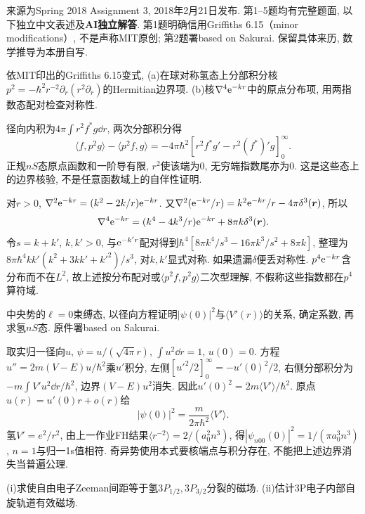 来源为Spring 2018 Assignment 3, 2018年2月21日发布. 第1--5题均有完整题面, 以下独立中文表述及\textbf{AI独立解答}. 第1题明确信用Griffiths 6.15（minor modifications）, 不是声称MIT原创; 第2题署based on Sakurai. 保留具体来历, 数学推导为本册自写.
\begin{exercise}
依MIT印出的Griffiths 6.15变式, (a)在球对称氢态上分部积分核$p^2=-\hbar^2r^{-2}\partial_r(r^2\partial_r)$的Hermitian边界项. (b)核$\nabla^4\mathrm e^{-kr}$中的原点分布项, 用两指数态配对检查对称性.
\end{exercise}
\begin{solution}
径向内积为$4\pi\int r^2f^*g\dd r$, 两次分部积分得
\[
\langle f,p^2g\rangle-\langle p^2f,g\rangle
=-4\pi\hbar^2[r^2f^*g'-r^2(f^*)'g]_0^\infty.
\]
正规$nS$态原点函数和一阶导有限, $r^2$使该端为0, 无穷端指数尾亦为0. 这是这些态上的边界核验, 不是任意函数域上的自伴性证明.

对$r>0$, $\nabla^2\mathrm e^{-kr}=(k^2-2k/r)\mathrm e^{-kr}$. 又$\nabla^2(\mathrm e^{-kr}/r)=k^2\mathrm e^{-kr}/r-4\pi\delta^3(\boldsymbol r)$, 所以
\[
\nabla^4\mathrm e^{-kr}=(k^4-4k^3/r)\mathrm e^{-kr}+8\pi k\delta^3(\boldsymbol r).
\]
令$s=k+k'$, $k,k'>0$, 与$\mathrm e^{-k'r}$配对得到$\hbar^4[8\pi k^4/s^3-16\pi k^3/s^2+8\pi k]$, 整理为
$8\pi\hbar^4kk'(k^2+3kk'+k'^2)/s^3$, 对$k,k'$显式对称. 如果遗漏$\delta$便丢对称性. $p^4\mathrm e^{-kr}$含分布而不在$L^2$, 故上述按分布配对或$\langle p^2f,p^2g\rangle$二次型理解, 不假称这些指数都在$p^4$算符域.
\end{solution}
\begin{exercise}
中央势的$\ell=0$束缚态, 以径向方程证明$|\psi(0)|^2$与$\langle V'(r)\rangle$的关系, 确定系数, 再求氢$nS$态. 原件署based on Sakurai.
\end{exercise}
\begin{solution}
取实归一径向$u$, $\psi=u/(\sqrt{4\pi}r)$, $\int u^2\dd r=1$, $u(0)=0$. 方程$u''=2m(V-E)u/\hbar^2$乘$u'$积分, 左侧$[u'^2/2]_0^\infty=-u'(0)^2/2$, 右侧分部积分为$-m\int V'u^2\dd r/\hbar^2$, 边界$(V-E)u^2$消失. 因此$u'(0)^2=2m\langle V'\rangle/\hbar^2$. 原点$u(r)=u'(0)r+o(r)$给
\[
|\psi(0)|^2=\frac{m}{2\pi\hbar^2}\langle V'\rangle.
\]
氢$V'=e^2/r^2$, 由上一作业FH结果$\langle r^{-2}\rangle=2/(a_0^2n^3)$, 得$|\psi_{n00}(0)|^2=1/(\pi a_0^3n^3)$, $n=1$与归一1s值相符. 奇异势使用本式要核端点与积分存在, 不能把上述边界消失当普遍公理.
\end{solution}
\begin{exercise}
(i)求使自由电子Zeeman间距等于氢$3P_{1/2},3P_{3/2}$分裂的磁场. (ii)估计3P电子内部自旋轨道有效磁场.
\end{exercise}
